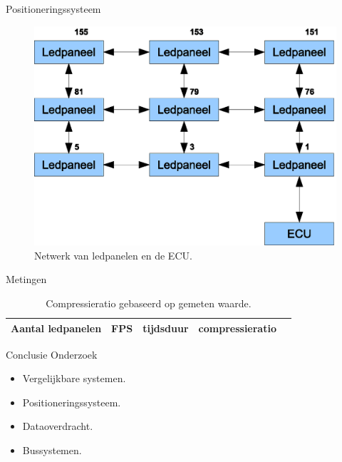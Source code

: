\begin{frame}{Positioneringssysteem}
	\begin{figure}[h]
		\centering
		\includegraphics[width=12cm]{animatie/7}
		\caption{Netwerk van ledpanelen en de ECU.}
	\end{figure}
\end{frame}

\begin{frame}{Metingen}
	\begin{table}[h]
		\begin{tabular}{lllll}
		Aantal ledpanelen	& FPS 		& tijdsduur 	& compressieratio \\
		\hline
		\end{tabular}
		\caption{Compressieratio gebaseerd op gemeten waarde.}
	\end{table}
\end{frame}

\begin{frame}{Conclusie}
	Onderzoek
	\begin{itemize}
		\item Vergelijkbare systemen.
		\item Positioneringssysteem.
		\item Dataoverdracht.
		\item Bussystemen.
	\end{itemize}
\end{frame}

